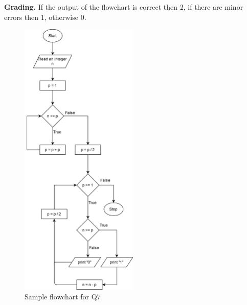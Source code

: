 \documentclass{article}
\begin{document}
\begin{flushleft}

\textbf{Grading. } If the output of the flowchart is correct then 2, if there 
are minor errors then 1, otherwise 0.

\end{flushleft}

\begin{figure}[ht]
    \centering
    \includegraphics[width=0.5\textwidth]{Q7.png}
    \caption{Sample flowchart for Q7}
    \label{Q7}
\end{figure}

\clearpage
\end{document}
